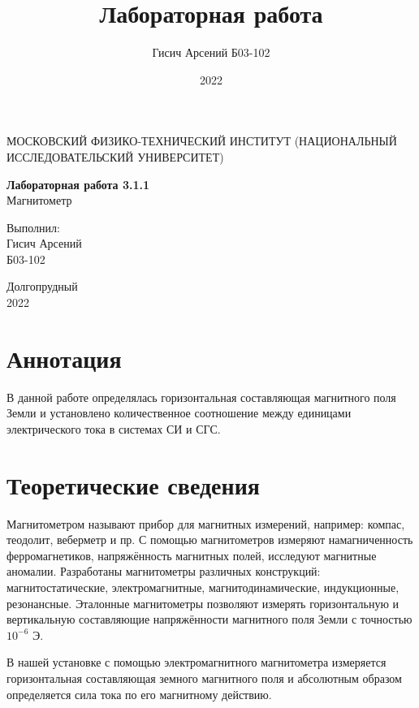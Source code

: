 \documentclass[a4paper, 12pt]{article}
\title{Лабораторная работа}
\author{Гисич Арсений Б03-102}
\date{2022}
\begin{document}
	\begin{center}
		{\large МОСКОВСКИЙ ФИЗИКО-ТЕХНИЧЕСКИЙ ИНСТИТУТ (НАЦИОНАЛЬНЫЙ ИССЛЕДОВАТЕЛЬСКИЙ УНИВЕРСИТЕТ)}
	\end{center}
	\vspace{5 cm}
	{\Large
		\begin{center}
			{\bf Лабораторная работа 3.1.1}\\[0.2 cm]
			Магнитометр
		\end{center}
	}
	\vspace{4 cm}
	\begin{flushright}
		{\Large Выполнил: \\
			\vspace{0.2 cm}
			Гисич Арсений \\
			\vspace{0.2 cm}
			Б03-102 \\}
	\end{flushright}
	\vspace{9 cm}
	\begin{center}
		Долгопрудный\\[0.1 cm]
		2022
	\end{center}
\thispagestyle{empty}

\section{Аннотация}

В данной работе определялась горизонтальная составляющая магнитного поля Земли и установлено количественное соотношение между единицами электрического тока в системах СИ и СГС.

\section{Теоретические сведения}

Магнитометром называют прибор для магнитных измерений, например: компас, теодолит, веберметр и пр. С помощью магнитометров измеряют намагниченность ферромагнетиков, напряжённость магнитных полей, исследуют магнитные аномалии. Разработаны магнитометры различных конструкций: магнитостатические, электромагнитные, магнитодинамические, индукционные, резонансные. Эталонные магнитометры позволяют измерять горизонтальную и вертикальную составляющие напряжённости магнитного поля Земли с точностью $10^{-6}$ Э.

В нашей установке с помощью электромагнитного магнитометра измеряется горизонтальная составляющая земного магнитного поля и абсолютным образом определяется сила тока по его магнитному действию.
\end{document}

